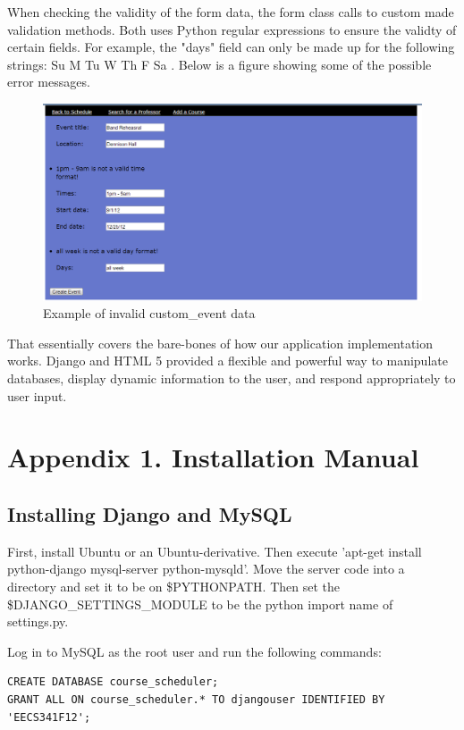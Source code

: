 \documentclass[pdftex,12pt,letter]{article}
\begin{document}
When checking the validity of the form data, the form class calls to custom made validation methods. Both uses Python regular expressions to ensure the validty of certain fields. For example, the "days" field can only be made up for the following strings: Su M Tu W Th F Sa . Below is a figure showing some of the possible error messages.
\begin{figure}
\includegraphics[width=6in]{eventErr.png}
\caption{Example of invalid custom\_event data}
\end{figure}
\FloatBarrier

That essentially covers the bare-bones of how our application implementation works. Django and HTML 5 provided a flexible and powerful way to manipulate databases, display dynamic information to the user, and respond appropriately to user input.
\appendix
\section{Appendix 1. Installation Manual}
\subsection{Installing Django and MySQL}
First, install Ubuntu or an Ubuntu-derivative.  Then execute 'apt-get install python-django mysql-server python-mysqld'.  Move the server code into a directory and set it to be on \$PYTHONPATH.  Then set the \$DJANGO\_SETTINGS\_MODULE to be the python import name of settings.py.

Log in to MySQL as the root user and run the following commands:

\begin{verbatim}
CREATE DATABASE course_scheduler;
GRANT ALL ON course_scheduler.* TO djangouser IDENTIFIED BY 'EECS341F12';
\end{verbatim}
\end{document}
